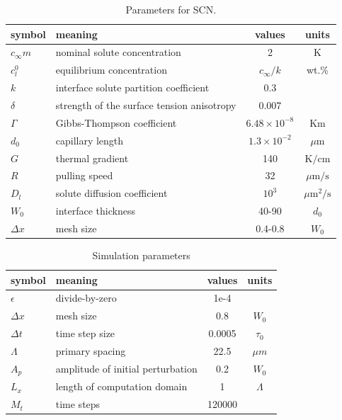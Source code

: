 \documentclass[a4paper,12pt]{article}
\begin{document}
\begin{table}
\centering
\caption{Parameters for SCN.}
\begin{tabular}{l l c c }
\toprule
symbol & meaning & values & units \\
\midrule
$c_{\infty}m$ & nominal solute concentration &  2 & K \\
$c_l^0$ & equilibrium concentration & $c_{\infty}/k$ & wt.\% \\
$k$ & interface solute partition coefficient & 0.3 &\\
$\delta$ & strength of the surface tension anisotropy  &  0.007  &\\
$\Gamma$ & Gibbs-Thompson coefficient & $6.48\times 10^{-8}$ & Km \\
$d_0$ & capillary length & $ 1.3\times10^{-2}$  & $\mu$m \\
$G$ & thermal gradient & 140 & $\text{K} / \text{cm}$ \\
$R$ & pulling speed &  32 & $\mu \text{m} / \text{s}$ \\
$D_l$ & solute diffusion coefficient &$10^{3}$ &  ${\mu\text{m}}^2/\text{s}$ \\
$W_0$ & interface thickness  & 40-90  & $d_0$ \\
$\Delta x$ & mesh size & 0.4-0.8 & $W_0$ \\
\bottomrule
\end{tabular}
\end{table}

\begin{table}
\centering
\caption{Simulation parameters}
\begin{tabular}{l l c c }
\toprule
symbol & meaning & values & units \\
\midrule
$\epsilon$ & divide-by-zero  & 1e-4  &\\
$\Delta x$ & mesh size & 0.8 & $W_0$ \\
$\Delta t$ & time step size& 0.0005& $\tau_0$ \\
$\Lambda$ & primary spacing & 22.5 & $\mu m$ \\
$A_p$ & amplitude of initial perturbation& 0.2 & $W_0$\\
$L_x$ & length of computation domain  &  1  & $\Lambda$\\
$M_t$ & time steps& 120000 & \\


\bottomrule
\end{tabular}
\end{table}
\end{document}
